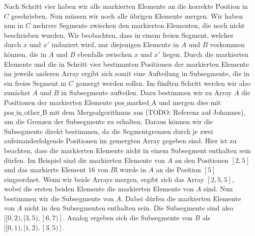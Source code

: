 Nach Schritt vier haben wir alle markierten Elemente an die korrekte Position in $C$ geschrieben. Nun müssen wir noch alle übrigen Elemente mergen. Wir haben nun in $C$ mehrere Segmente zwischen den markierten Elementen, die noch nicht beschrieben wurden. Wir beobachten, dass in einem freien Segment, welches durch $x$ und $x'$ induziert wird, nur diejenigen Elemente in $A$ und $B$ vorkommen können, die in $A$ und $B$ ebenfalls zwischen $x$ und $x'$ liegen. Durch die markierten Elemente und die in Schritt vier bestimmten Positionen der markierten Elemente im jeweils anderen Array ergibt sich somit eine Aufteilung in Subsegmente, die in ein freies Segment in $C$ gemergt werden sollen.
Im fünften Schritt werden wir also zunächst $A$ und $B$ in Subsegmente aufteilen. Dazu bestimmen wir zu Array $A$ die Positionen der markierten Elemente $\text{pos\_marked\_A}$ und mergen dies mit $\text{pos\_in\_other\_B}$ mit dem Mergealgorithmus aus (TODO: Referenz auf Johannes), um die Grenzen der Subsegmente zu erhalten. Daraus können wir die Subsegmente direkt bestimmen, da die Segmentgrenzen durch je zwei aufeinanderfolgende Positionen im gemergten Array gegeben sind. Hier ist zu beachten, dass die markierten Elemente nicht in einem Subsegment enthalten sein dürfen. 
Im Beispiel sind die markierten Elemente von $A$ an den Positionen $[2,5]$ und das markierte Element $16$ von $B$l wurde in $A$ an die Position $[5]$ eingeordnet. Wenn wir beide Arrays mergen, ergibt sich das Array $[2,5,5]$, wobei die ersten beiden Elemente die markierten Elemente von $A$ sind. Nun bestimmen wir die Subsegmente von $A$. Dabei dürfen die markierten Elemente von $A$ nicht in den Subsegmenten enthalten sein. Die Subsegmente sind also $[[0,2), [3,5), [6,7)]$. Analog ergeben sich die Subsegmente von $B$ als $[[0,1), [1,2), [3,5)]$.

